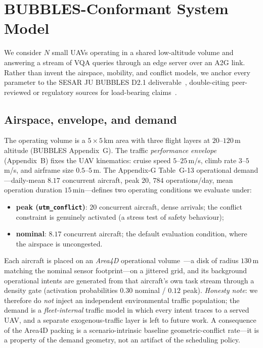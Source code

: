 \section{BUBBLES-Conformant System Model}\label{sec:system}

We consider $N$ small UAVs operating in a shared low-altitude volume and
answering a stream of VQA queries through an edge server over an A2G link.
Rather than invent the airspace, mobility, and conflict models, we anchor
every parameter to the SESAR JU BUBBLES D2.1
deliverable~\cite{bubbles2022d21}, double-citing peer-reviewed or regulatory
sources for load-bearing claims~\cite{weinert2022well,eu2021664}.

\subsection{Airspace, envelope, and demand}
The operating volume is a $5\times5$\,km area with three flight layers at
$20$--$120$\,m altitude (BUBBLES Appendix~G). The traffic
\emph{performance envelope} (Appendix~B) fixes the UAV kinematics: cruise
speed $5$--$25$\,m/s, climb rate $3$--$5$\,m/s, and airframe size
$0.5$--$5$\,m. The Appendix-G Table~G-13 operational demand---daily-mean
$8.17$ concurrent aircraft, peak $20$, $784$ operations/day, mean operation
duration $15$\,min---defines two operating conditions we evaluate under:

\begin{itemize}
\item \textbf{peak (\texttt{utm\_conflict})}: $20$ concurrent aircraft,
dense arrivals; the conflict constraint is genuinely activated (a stress
test of safety behaviour);
\item \textbf{nominal}: $8.17$ concurrent aircraft; the default evaluation
condition, where the airspace is uncongested.
\end{itemize}

Each aircraft is placed on an \emph{Area4D} operational
volume~\cite{bubbles2022d21}---a disk of radius $130$\,m matching the
nominal sensor footprint---on a jittered grid, and its background
operational intents are generated from that aircraft's own task stream
through a density gate (activation probabilities $0.30$ nominal /
$0.12$ peak). \emph{Honesty note}: we therefore do \emph{not} inject an
independent environmental traffic population; the demand is a
\emph{fleet-internal} traffic model in which every intent traces to a
served UAV, and a separate exogenous-traffic layer is left to future work.
A consequence of the Area4D packing is a scenario-intrinsic baseline
geometric-conflict rate---it is a property of the demand geometry, not an
artifact of the scheduling policy.

